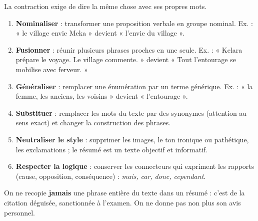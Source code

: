 \documentclass[11pt]{article}
\newcommand{\cle}[1]{{\popxbold\color{popdark}#1}}
\begin{document}
\begin{methode}
La contraction exige de dire la même chose avec ses propres mots.
\begin{enumerate}
\item \textbf{Nominaliser} : transformer une proposition verbale en groupe nominal. Ex. : « le village envie Meka » devient « l'envie du village ».
\item \textbf{Fusionner} : réunir plusieurs phrases proches en une seule. Ex. : « Kelara prépare le voyage. Le village commente. » devient « Tout l'entourage se mobilise avec ferveur. »
\item \textbf{Généraliser} : remplacer une énumération par un terme générique. Ex. : « la femme, les anciens, les voisins » devient « l'entourage ».
\item \textbf{Substituer} : remplacer les mots du texte par des synonymes (attention au sens exact) et changer la construction des phrases.
\item \textbf{Neutraliser le style} : supprimer les images, le ton ironique ou pathétique, les exclamations ; le résumé est un texte \cle{objectif} et \cle{informatif}.
\item \textbf{Respecter la logique} : conserver les connecteurs qui expriment les rapports (cause, opposition, conséquence) : \emph{mais, car, donc, cependant}.
\end{enumerate}
\begin{attention}
On ne recopie \textbf{jamais} une phrase entière du texte dans un résumé : c'est de la citation déguisée, sanctionnée à l'examen. On ne donne pas non plus son avis personnel.
\end{attention}
\end{methode}
\end{document}
